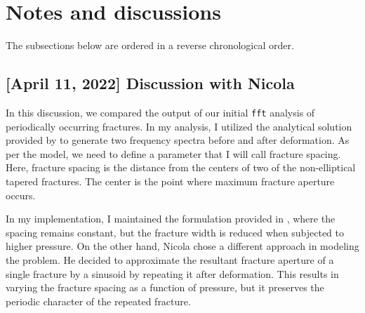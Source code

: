 \documentclass[11pt,titlepage]{article}
\begin{document}
\section{Notes and discussions}
The subsections below are ordered in a reverse chronological order.
\subsection{[April 11, 2022] Discussion with Nicola}
In this discussion, we compared the output of our initial \texttt{fft} analysis of periodically occurring fractures. In my analysis, I utilized the analytical solution provided by \cite{Mavko1978} to generate two frequency spectra before and after deformation. As per the \citep{Mavko1978} model, we need to define a parameter that I will call fracture spacing. Here, fracture spacing is the distance from the centers of two of the non-elliptical tapered fractures. The center is the point where maximum fracture aperture occurs. 

In my implementation, I maintained the formulation provided in \citep{Mavko1978}, where the spacing remains constant, but the fracture width is reduced when subjected to higher pressure. On the other hand, Nicola chose a different approach in modeling the problem. He decided to approximate the resultant fracture aperture of a single fracture by a sinusoid by repeating it after deformation. This results in varying the fracture spacing as a function of pressure, but it preserves the periodic character of the repeated fracture. 
\end{document}

